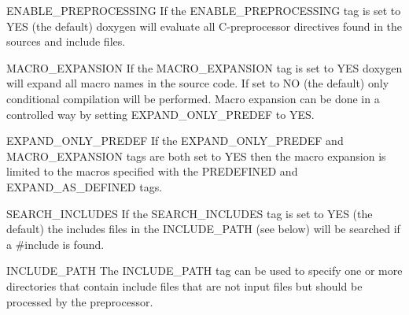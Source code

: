 \begin{DoxyDescription}
\item[{\ttfamily ENABLE\_\-PREPROCESSING} ] If the {\ttfamily ENABLE\_\-PREPROCESSING} tag is set to {\ttfamily YES} (the default) doxygen will evaluate all C-\/preprocessor directives found in the sources and include files.

\label{config_cfg_macro_expansion}
\hypertarget{config_cfg_macro_expansion}{}
 
\item[{\ttfamily MACRO\_\-EXPANSION} ] If the {\ttfamily MACRO\_\-EXPANSION} tag is set to {\ttfamily YES} doxygen will expand all macro names in the source code. If set to {\ttfamily NO} (the default) only conditional compilation will be performed. Macro expansion can be done in a controlled way by setting {\ttfamily EXPAND\_\-ONLY\_\-PREDEF} to {\ttfamily YES}.

\label{config_cfg_expand_only_predef}
\hypertarget{config_cfg_expand_only_predef}{}
 
\item[{\ttfamily EXPAND\_\-ONLY\_\-PREDEF} ] If the {\ttfamily EXPAND\_\-ONLY\_\-PREDEF} and {\ttfamily MACRO\_\-EXPANSION} tags are both set to YES then the macro expansion is limited to the macros specified with the {\ttfamily PREDEFINED} and {\ttfamily EXPAND\_\-AS\_\-DEFINED} tags.

\label{config_cfg_search_includes}
\hypertarget{config_cfg_search_includes}{}
 
\item[{\ttfamily SEARCH\_\-INCLUDES} ] If the {\ttfamily SEARCH\_\-INCLUDES} tag is set to {\ttfamily YES} (the default) the includes files in the {\ttfamily INCLUDE\_\-PATH} (see below) will be searched if a \#include is found.

\label{config_cfg_include_path}
\hypertarget{config_cfg_include_path}{}
 
\item[{\ttfamily INCLUDE\_\-PATH} ] The {\ttfamily INCLUDE\_\-PATH} tag can be used to specify one or more directories that contain include files that are not input files but should be processed by the preprocessor.

\label{config_cfg_predefined}
\hypertarget{config_cfg_predefined}{}
 

\end{DoxyDescription}
